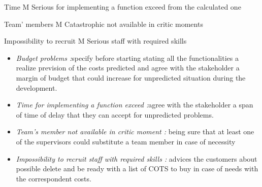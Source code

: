 		Time                                    M                            Serious
		for implementing 
		a function exceed
		from the calculated one
		
		Team’ members                  M                            Catastrophic
		not available in critic
		moments
		
		Impossibility to recruit          M                           Serious
		staff with required skills  

\begin{itemize}
	\item \emph{Budget problems :}specify before starting stating all the functionalities a realize prevision of the costs predicted and agree with the stakeholder a margin of budget that could increase for unpredicted situation during the development.
	
	\item \emph{Time for implementing a function exceed :}agree with the stakeholder a span of time of delay that they can accept for unpredicted problems.
	
	\item \emph{Team’s member not available in critic moment :} being sure that at least one of the supervisors could substitute a team member in case of necessity
	
	\item \emph{Impossibility to recruit staff with required skills :} advices the customers about possible delete and be ready with a list of COTS to buy in case of needs with the correspondent costs.
	
\end{itemize}
